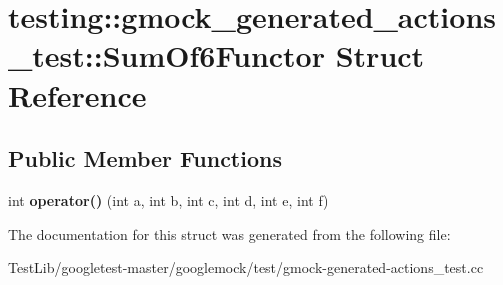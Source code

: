 \hypertarget{structtesting_1_1gmock__generated__actions__test_1_1SumOf6Functor}{}\section{testing\+:\+:gmock\+\_\+generated\+\_\+actions\+\_\+test\+:\+:Sum\+Of6\+Functor Struct Reference}
\label{structtesting_1_1gmock__generated__actions__test_1_1SumOf6Functor}
\subsection*{Public Member Functions}
\begin{DoxyCompactItemize}
\item 
\mbox{\label{structtesting_1_1gmock__generated__actions__test_1_1SumOf6Functor_adb500f7bdfa5a5887623fa38cd805e41}} 
int {\bfseries operator()} (int a, int b, int c, int d, int e, int f)
\end{DoxyCompactItemize}


The documentation for this struct was generated from the following file\+:\begin{DoxyCompactItemize}
\item 
Test\+Lib/googletest-\/master/googlemock/test/gmock-\/generated-\/actions\+\_\+test.\+cc\end{DoxyCompactItemize}
